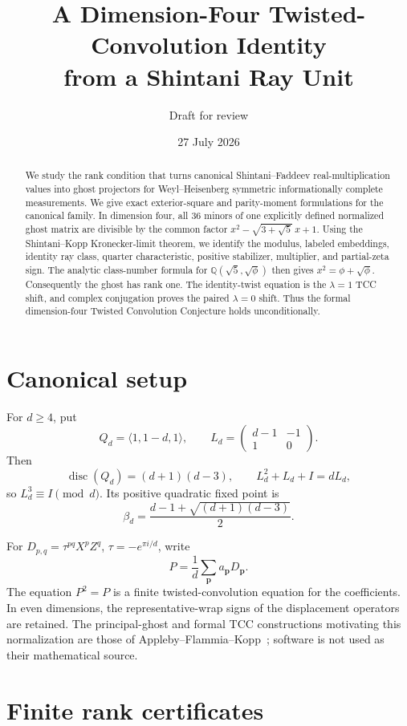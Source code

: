 \documentclass[11pt]{article}
\title{A Dimension-Four Twisted-Convolution Identity\\
from a Shintani Ray Unit}
\author{Draft for review}
\date{27 July 2026}
\newcommand{\Q}{\mathbb Q}
\begin{document}
\maketitle

\begin{abstract}
We study the rank condition that turns canonical
Shintani--Faddeev real-multiplication values into ghost projectors for
Weyl--Heisenberg symmetric informationally complete measurements.
We give exact exterior-square and parity-moment formulations
for the canonical family.  In dimension four, all $36$ minors of one
explicitly defined normalized ghost matrix
are divisible by the common factor
$x^2-\sqrt{3+\sqrt5}\,x+1$.  Using the Shintani--Kopp
Kronecker-limit theorem, we identify the modulus, labeled embeddings,
identity ray class, quarter characteristic, positive stabilizer,
multiplier, and partial-zeta sign.  The analytic class-number formula
for $\Q(\sqrt5,\sqrt\phi)$ then gives
$x^2=\phi+\sqrt\phi$.  Consequently the ghost has rank one.  The
identity-twist equation is the $\lambda=1$ TCC shift, and complex
conjugation proves the paired $\lambda=0$ shift.  Thus the formal
dimension-four Twisted Convolution Conjecture holds unconditionally.
\end{abstract}

\section{Canonical setup}

For $d\ge4$, put
\[
 Q_d=\langle1,1-d,1\rangle,\qquad
 L_d=\begin{pmatrix}d-1&-1\\1&0\end{pmatrix}.
\]
Then
\[
 \operatorname{disc}(Q_d)=(d+1)(d-3),\qquad
 L_d^2+L_d+I=dL_d,
\]
so $L_d^3\equiv I\pmod d$.  Its positive quadratic fixed point is
\[
 \beta_d=\frac{d-1+\sqrt{(d+1)(d-3)}}2.
\]

For $D_{p,q}=\tau^{pq}X^pZ^q$, $\tau=-e^{\pi i/d}$, write
\[
 P=\frac1d\sum_{\boldsymbol p}a_{\boldsymbol p}D_{\boldsymbol p}.
\]
The equation $P^2=P$ is a finite twisted-convolution equation for
the coefficients.  In even dimensions, the representative-wrap signs
of the displacement operators are retained.  The principal-ghost and
formal TCC constructions motivating this normalization are those of
Appleby--Flammia--Kopp~\cite{AFK}; software is not used as their
mathematical source.

\section{Finite rank certificates}
\end{document}
